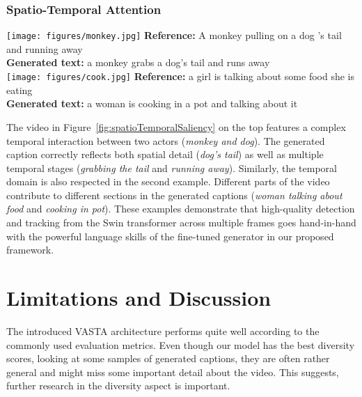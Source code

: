 \documentclass[runningheads,table]{llncs}
\newcommand{\modelName}{VASTA\xspace}
\begin{document}
\subsubsection{Spatio-Temporal Attention}
\begin{figure*}
    {\centering 
    \texttt{[image: figures/monkey.jpg]} 
    }
    \scriptsize{ 
        \textbf{Reference:} A monkey pulling on a dog 's tail and running away
        \\
        \textbf{Generated text:} a monkey grabs a dog's tail and runs away\\[1ex] 
    }
    {\centering
    \texttt{[image: figures/cook.jpg]} 
    }
    \scriptsize{
        \textbf{Reference:} a girl is talking about some food she is eating\\
        \textbf{Generated text:} a woman is cooking in a pot and talking about it 
    }
 \vspace{-0.3cm}

    \caption{Spatio-temporal inference gathers information from different segments.
}\label{fig:spatioTemporalSaliency}
\end{figure*}
The video in Figure~\ref{fig:spatioTemporalSaliency} on the top features a complex temporal interaction between two actors ({\it monkey and dog}). The generated caption correctly reflects both spatial detail ({\it dog's tail}) as well as multiple temporal stages ({\it grabbing the tail} and {\it running away}). Similarly, the temporal domain is also respected in the second example. Different parts of the video contribute to different sections in the generated captions ({\it woman talking about food} and {\it cooking in pot}). 
These examples demonstrate that high-quality detection and tracking from the Swin transformer across multiple frames goes hand-in-hand with the powerful language skills of the fine-tuned generator in our proposed framework. 
 \section{Limitations and Discussion}
The introduced \modelName architecture performs quite well according to the commonly used evaluation metrics.
Even though our model has the best diversity scores, looking at some samples of generated captions, they are often rather general and might miss some important detail about the video. This suggests, further research in the diversity aspect is important.
\end{document}
